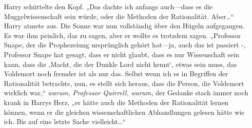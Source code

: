 Harry schüttelte den Kopf.
„Das dachte ich anfangs auch—dass es die Muggelwissenschaft sein würde, oder die Methoden der Rationalität. Aber…“
Harry atmete aus. Die Sonne war nun vollständig über den Hügeln aufgegangen. Es war ihm peinlich, das zu sagen, aber er wollte es trotzdem sagen.
„Professor Snape, der die Prophezeiung ursprünglich gehört hat—ja, auch das ist passiert -, Professor Snape hat gesagt, dass er nicht glaubt, dass es nur Wissenschaft sein kann, dass die ‚Macht, die der Dunkle Lord nicht kennt‘, etwas sein muss, das Voldemort noch fremder ist als nur das. Selbst wenn ich es in Begriffen der Rationalität betrachte, nun, es stellt sich heraus, dass die Person, die Voldemort wirklich war,“
\emph{warum, Professor Quirrell, warum,} der Gedanke stach immer noch krank in Harrys Herz,
„er hätte auch die Methoden der Rationalität lernen können, wenn er die gleichen wissenschaftlichen Abhandlungen gelesen hätte wie ich. Bis auf eine letzte Sache vielleicht…“
